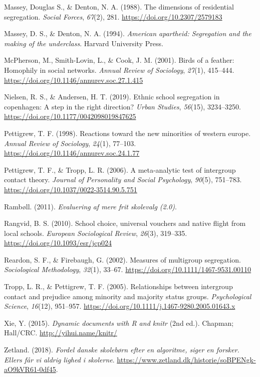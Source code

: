 \documentclass[
]{book}
\newlength{\cslhangindent}
\newenvironment{CSLReferences}[2] %
 {\begin{list}{}{%
  \setlength{\itemindent}{0pt}
  \setlength{\leftmargin}{0pt}
  \setlength{\parsep}{0pt}
  \ifodd #1
   \setlength{\leftmargin}{\cslhangindent}
   \setlength{\itemindent}{-1\cslhangindent}
  \fi
  \setlength{\itemsep}{#2\baselineskip}}}
 {\end{list}}
\begin{document}
\begin{CSLReferences}{1}{0}
Massey, Douglas S., \& Denton, N. A. (1988). The dimensions of residential segregation. \emph{Social Forces}, \emph{67}(2), 281. \url{https://doi.org/10.2307/2579183}

Massey, D. S., \& Denton, N. A. (1994). \emph{American apartheid: Segregation and the making of the underclass}. Harvard University Press.

McPherson, M., Smith-Lovin, L., \& Cook, J. M. (2001). Birds of a feather: Homophily in social networks. \emph{Annual Review of Sociology}, \emph{27}(1), 415--444. \url{https://doi.org/10.1146/annurev.soc.27.1.415}

Nielsen, R. S., \& Andersen, H. T. (2019). Ethnic school segregation in copenhagen: A step in the right direction? \emph{Urban Studies}, \emph{56}(15), 3234--3250. \url{https://doi.org/10.1177/0042098019847625}

Pettigrew, T. F. (1998). Reactions toward the new minorities of western europe. \emph{Annual Review of Sociology}, \emph{24}(1), 77--103. \url{https://doi.org/10.1146/annurev.soc.24.1.77}

Pettigrew, T. F., \& Tropp, L. R. (2006). A meta-analytic test of intergroup contact theory. \emph{Journal of Personality and Social Psychology}, \emph{90}(5), 751--783. \url{https://doi.org/10.1037/0022-3514.90.5.751}

Rambøll. (2011). \emph{Evaluering af mere frit skolevalg (2.0)}.

Rangvid, B. S. (2010). School choice, universal vouchers and native flight from local schools. \emph{European Sociological Review}, \emph{26}(3), 319--335. \url{https://doi.org/10.1093/esr/jcp024}

Reardon, S. F., \& Firebaugh, G. (2002). Measures of multigroup segregation. \emph{Sociological Methodology}, \emph{32}(1), 33--67. \url{https://doi.org/10.1111/1467-9531.00110}

Tropp, L. R., \& Pettigrew, T. F. (2005). Relationships between intergroup contact and prejudice among minority and majority status groups. \emph{Psychological Science}, \emph{16}(12), 951--957. \url{https://doi.org/10.1111/j.1467-9280.2005.01643.x}

Xie, Y. (2015). \emph{Dynamic documents with {R} and knitr} (2nd ed.). Chapman; Hall/CRC. \url{http://yihui.name/knitr/}

Zetland. (2018). \emph{Fordel danske skolebørn efter en algoritme, siger en forsker. Ellers får vi aldrig lighed i skolerne}. \url{https://www.zetland.dk/historie/soBPENgk-aO9kVR61-0df45}.

\end{CSLReferences}
\end{document}
